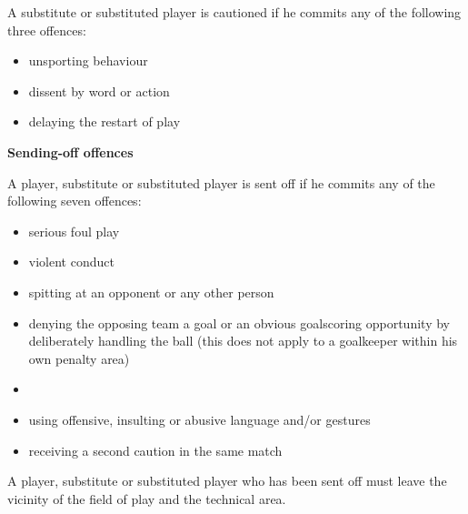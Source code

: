 \bigskip

A substitute or substituted player is cautioned if he commits any of the following three offences: 

\begin{itemize}
\item unsporting behaviour
\item dissent by word or action 
\item delaying the restart of play
\end{itemize}

{\bfseries Sending-off offences}

\headlinebox

A player, substitute or substituted player is sent off if he commits any of the following seven offences:

\begin{itemize}
\item serious foul play
\item violent conduct
\item spitting at an opponent or any other person
\item denying the opposing team a goal or an obvious goalscoring opportunity by deliberately handling the ball (this does not apply to a goalkeeper within his own penalty area)
\item {}
\item using offensive, insulting or abusive language and/or gestures
\item receiving a second caution in the same match
\end{itemize}

\bigskip

A player, substitute or substituted player who has been sent off must leave the vicinity of the field of play and the technical area.